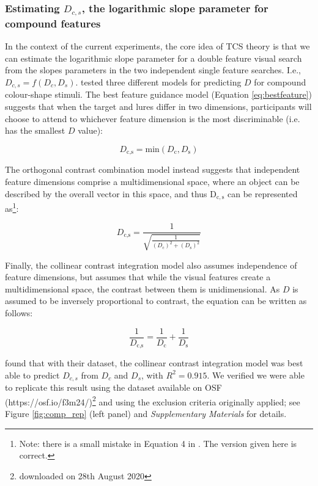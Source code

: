\documentclass[smallextended, natbib]{svjour3}       %
\begin{document}
\subsubsection{Estimating $D_{c,s}$, the logarithmic slope parameter for compound features}

In the context of the current experiments, the core idea of TCS theory is that we can estimate the logarithmic slope parameter for a double feature visual search from the slopes parameters in the two independent single feature searches. I.e., $D_{c,s} = f(D_c, D_s)$. \cite{buetti2019predicting} tested three different models for predicting $D$ for compound colour-shape stimuli. The best feature guidance model (Equation \ref{eq:bestfeature}) suggests that when the target and lures differ in two dimensions, participants will choose to attend to whichever feature dimension is the most discriminable (i.e. has the smallest $D$ value):

\begin{equation}
D_\text{c,s} = \text{min}\left(D_\text{c}, D_\text{s}\right)
\label{eq:bestfeature}
\end{equation}

The orthogonal contrast combination model instead suggests that independent feature dimensions comprise a multidimensional space, where an object can be described by the overall vector in this space, and thus $\mathrm{D_{c,s}}$ can be represented as\footnote{Note: there is a small mistake in Equation 4 in \cite{buetti2019predicting}. The version given here is correct.}:

\begin{equation}
D_\text{c,s} = \frac{1}{\sqrt{\frac{1}{(D_\text{c})^2 + (D_\text{s})^2}}}
\label{eq:orthogonalcontrast}
\end{equation}

Finally, the collinear contrast integration model also assumes independence of feature dimensions, but assumes that while the visual features create a multidimensional space, the contrast between them is unidimensional. As $D$ is assumed to be inversely proportional to contrast, the equation can be written as follows:

\begin{equation}
\frac{1}{D_\text{c,s}} = \frac{1}{D_\text{c}} + \frac{1}{D_\text{s}}
\label{eq:collinearcontrast}
\end{equation}

\cite{buetti2019predicting} found that with their dataset, the collinear contrast integration model was best able to predict $D_{c,s}$ from $D_c$ and $D_s$, with $R^2 = 0.915$. We verified we were able to replicate this result using the dataset available on OSF (https://osf.io/f3m24/)\footnote{downloaded on 28th August 2020} and using the exclusion criteria originally applied; see Figure \ref{fig:comp_rep} (left panel) and \textit{Supplementary Materials} for details.
\end{document}
